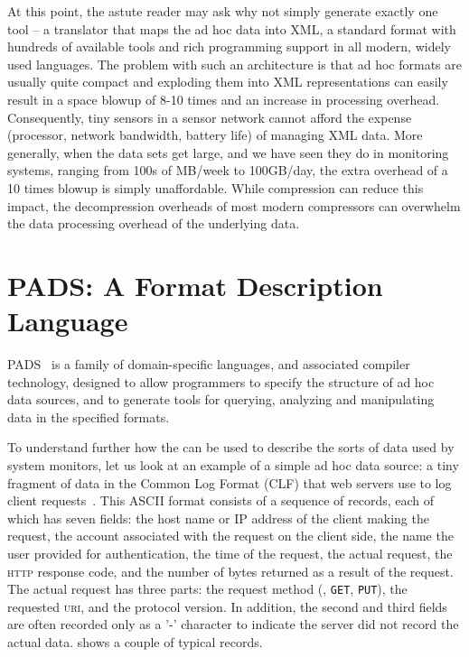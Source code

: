 \documentclass{sigplanconf}
\begin{document}
At this point, the astute reader may ask why not simply generate
exactly one tool -- a translator that maps the ad hoc data into
XML, a standard format with hundreds of available tools and
rich programming support in all modern, widely used languages.
The problem with such an architecture is that ad hoc formats
are usually quite compact and exploding them into XML representations
can easily result in a space blowup of 8-10 times and an increase
in processing overhead.  Consequently, tiny
sensors in a sensor network cannot afford the expense (processor,
network bandwidth, battery life) of managing
XML data.  More generally, when the data sets get large, and we 
have seen they do in monitoring systems, 
ranging from 100s of MB/week to 100GB/day,
the extra overhead of a 10 times blowup is simply unaffordable.
While compression can reduce this impact, the decompression overheads
of most modern compressors can overwhelm the data processing overhead
of the underlying data.

\section{PADS:  A Format Description Language}
\label{sec:pads}

PADS~\cite{fisher+:pads,launchpads,fisher+:700,mandelbaum+:padsml} is 
a family of domain-specific languages, and associated compiler technology, 
designed to allow programmers to specify the structure of ad hoc data sources, 
and to generate tools for querying, analyzing and manipulating data in the specified formats.

To understand further how the \pads{} can be used to describe the sorts of data used by system monitors,
let us look at an example of a simple ad hoc data source:
a tiny fragment of data in the Common Log Format (CLF) that web
servers use to log client requests~\cite{wpp}.  
This ASCII format consists of a sequence of
records, each of which has seven fields: the host name or IP address
of the client making the request, the account associated with the
request on the client side, the name the user provided for
authentication, the time of the request, the actual request, the
\textsc{http} response code, and the number of bytes returned as a
result of the request.  The actual request has three parts: the
request method (\eg, \texttt{GET}, \texttt{PUT}), the requested
\textsc{uri}, and the protocol version.  In addition, the second and
third fields are often recorded only as a '-' character to indicate
the server did not record the actual data.  
shows a couple of typical records.
\end{document}
